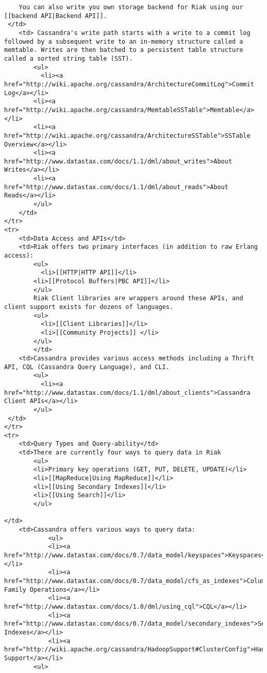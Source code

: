 \documentclass[letter]{book}
\newcounter{tab}[chapter]
\begin{document}
\begin{shaded}\begin{verbatim}
    You can also write you own storage backend for Riak using our [[backend API|Backend API]].
 </td>
    <td> Cassandra's write path starts with a write to a commit log followed by a subsequent write to an in-memory structure called a memtable. Writes are then batched to a persistent table structure called a sorted string table (SST).
        <ul>
          <li><a href="http://wiki.apache.org/cassandra/ArchitectureCommitLog">Commit Log</a></li>
        <li><a href="http://wiki.apache.org/cassandra/MemtableSSTable">Memtable</a></li>
        <li><a href="http://wiki.apache.org/cassandra/ArchitectureSSTable">SSTable Overview</a></li>
        <li><a href="http://www.datastax.com/docs/1.1/dml/about_writes">About Writes</a></li>
        <li><a href="http://www.datastax.com/docs/1.1/dml/about_reads">About Reads</a></li>
        </ul>
    </td>
</tr>
<tr>
    <td>Data Access and APIs</td>
    <td>Riak offers two primary interfaces (in addition to raw Erlang access):
		<ul>
		  <li>[[HTTP|HTTP API]]</li>
		<li>[[Protocol Buffers|PBC API]]</li>
		</ul>
		Riak Client libraries are wrappers around these APIs, and client support exists for dozens of languages. 
		<ul>
		  <li>[[Client Libraries]]</li>
		  <li>[[Community Projects]] </li>
		</ul>
		</td>
    <td>Cassandra provides various access methods including a Thrift API, CQL (Cassandra Query Language), and CLI. 
		<ul>
		  <li><a href="http://www.datastax.com/docs/1.1/dml/about_clients">Cassandra Client APIs</a></li>
		</ul>		
 </td>
</tr>
<tr>
    <td>Query Types and Query-ability</td>
    <td>There are currently four ways to query data in Riak
        <ul>
        <li>Primary key operations (GET, PUT, DELETE, UPDATE)</li>
        <li>[[MapReduce|Using MapReduce]]</li>
        <li>[[Using Secondary Indexes]]</li>
        <li>[[Using Search]]</li>
        </ul>

</td>
    <td>Cassandra offers various ways to query data:
            <ul>
            <li><a href="http://www.datastax.com/docs/0.7/data_model/keyspaces">Keyspaces</a></li>
            <li><a href="http://www.datastax.com/docs/0.7/data_model/cfs_as_indexes">Column Family Operations</a></li>
            <li><a href="http://www.datastax.com/docs/1.0/dml/using_cql">CQL</a></li>
            <li><a href="http://www.datastax.com/docs/0.7/data_model/secondary_indexes">Secondary Indexes</a></li>
            <li><a href="http://wiki.apache.org/cassandra/HadoopSupport#ClusterConfig">Hadoop Support</a></li>
        <ul>


\end{verbatim}
\end{shaded}
\end{document}
